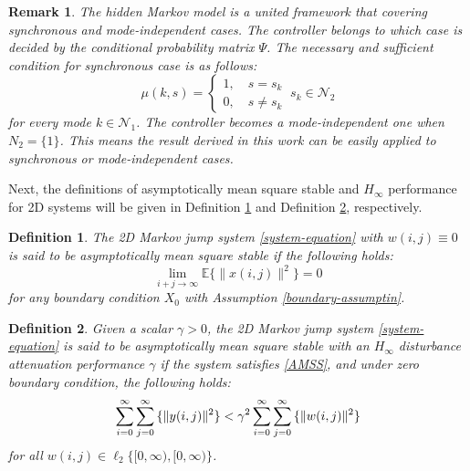 \documentclass[conference]{IEEEtran}
\newtheorem{remark}{Remark}
\newtheorem{definition}{Definition}
\begin{document}
\begin{remark}
	The hidden Markov model is a united framework that covering synchronous and mode-independent cases. The controller belongs to which case is decided by the conditional probability matrix $\varPsi$.  The necessary and sufficient condition for synchronous case is as follows:
	\begin{equation*}
	\mu(k,s)=
	\begin{cases}
	1, \quad s=s_{k}\\
	0, \quad s\neq s_{k}
	\end{cases}\ s_{k}\in\mathcal{N}_{2}
	\end{equation*}
	for every mode $k\in\mathcal{N}_{1}$. The controller becomes a mode-independent one when $N_{2}=\{1\}$. This means the result derived in this work can be easily applied to synchronous or mode-independent cases.
\end{remark}
	
	Next, the definitions of  asymptotically mean square stable and $H_{\infty}$ performance for 2D systems will be given in Definition \ref{mean-square-stable} and Definition \ref{H_infty-performance}, respectively.
	
	\begin{definition}\label{mean-square-stable}
	The 2D Markov jump system \eqref{system-equation} with $w(i,j)\equiv0$ is said to be asymptotically mean square stable if the following holds:
	\begin{equation}\label{AMSS}
			\lim\limits_{i+j\to\infty}\mathbb{E}\{\|x(i,j)\|^{2}\} = 0
	\end{equation}
	for any boundary condition $X_{0}$ with Assumption \ref{boundary-assumptin}.
	\end{definition}


	\begin{definition}\label{H_infty-performance}
		Given a scalar $\gamma>0$, the 2D Markov jump system \eqref{system-equation} is said to be asymptotically mean square stable with an $H_{\infty}$ disturbance attenuation performance $\gamma$ if the system satisfies \eqref{AMSS}, and under zero boundary condition, the following holds:
		\begin{equation} \label{invDef2}
			\sum_{i=0}^{\infty}\sum_{j=0}^{\infty}\mathbb\{\|y(i,j)\|^{2}\} <  \gamma^{2} \sum_{i=0}^{\infty}\sum_{j=0}^{\infty}\mathbb\{\|w(i,j)\|^{2}\}
		\end{equation}
		for all $w(i,j)\in\ell_{2}\{[0,\infty),[0,\infty)\}$.
	\end{definition}
	
\end{document}
